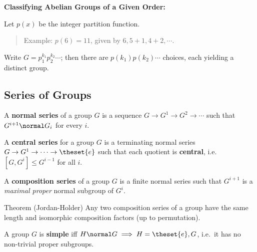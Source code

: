 \textbf{Classifying Abelian Groups of a Given Order:}

Let \(p(x)\) be the integer partition function.

\begin{quote}
Example: \(p(6) = 11\), given by \(6, 5+1, 4+2, \cdots\).
\end{quote}

Write \(G = p_1^{k_1} p_2^{k_2} \cdots\); then there are
\(p(k_1) p(k_2) \cdots\) choices, each yielding a distinct group.

\hypertarget{series-of-groups}{%
\subsection{Series of Groups}\label{series-of-groups}}

\begin{definition}

A \textbf{normal series} of a group \(G\) is a sequence
\(G \to G^1 \to G^2 \to \cdots\) such that \(G^{i+1} \normal G_i\) for
every \(i\).

\end{definition}

\begin{definition}

A \textbf{central series} for a group \(G\) is a terminating normal
series \(G \to G^1 \to \cdots \to \theset{e}\) such that each quotient
is \textbf{central}, i.e.~\([G, G^i] \leq G^{i-1}\) for all \(i\).

\end{definition}

\begin{definition}

A \textbf{composition series} of a group \(G\) is a finite normal series
such that \(G^{i+1}\) is a \emph{maximal proper} normal subgroup of
\(G^i\).

\end{definition}

Theorem (Jordan-Holder) Any two composition series of a group have the
same length and isomorphic composition factors (up to permutation).

\begin{definition}

A group \(G\) is \textbf{simple} iff
\(H\normal G \implies H = \theset{e}, G\), i.e.~it has no non-trivial
proper subgroups.

\end{definition}

